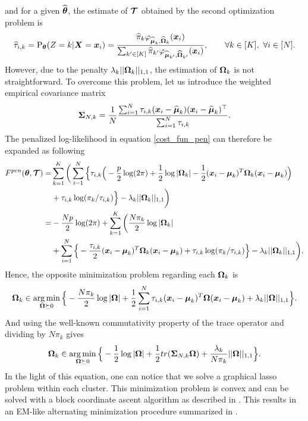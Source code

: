 and for a given $\widehat{{\boldsymbol\theta}}$, the estimate of $\boldsymbol{\mathcal T}$ obtained by the second optimization problem is
\begin{equation}
\label{em-sols-tau}
\widehat\tau_{i,k} = \text{P}_{{\boldsymbol\theta}}(Z=k|\boldsymbol X=\boldsymbol x_i)=\frac{\widehat\pi_k\varphi_{\widehat{\boldsymbol\mu}_k,\widehat{\boldsymbol\Omega}_k}(\boldsymbol x_i)}{\sum_{k'\in[K]}\widehat\pi_{k'}\varphi_{\widehat{\boldsymbol\mu}_{k'},\widehat{\boldsymbol\Omega}_{k'}}(\boldsymbol x_i)},\qquad\forall k\in[K],\ \forall i\in[N].
\end{equation}
However, due to the penalty $\lambda_k||\boldsymbol\Omega_k||_{1,1}$, the estimation of $\boldsymbol\Omega_k$ is not straightforward. To overcome this problem, let us introduce the weighted empirical covariance matrix
\begin{equation}
\boldsymbol\Sigma_{N,k} = \frac{1}{N}\frac{\sum_{i=1}^N\tau_{i,k}(\boldsymbol x_i-\widehat{\boldsymbol\mu}_k)(\boldsymbol x_i-\widehat{\boldsymbol\mu}_k)^\top}{\sum_{i=1}^N\tau_{i,k}}.
\end{equation}
The penalized log-likelihood in equation \eqref{cost_fun_pen} can therefore be expanded as following
\begin{align*}
\label{cost_fun_pen_2}
F^{pen}({\boldsymbol\theta},\boldsymbol{\mathcal T})  =& \sum_{k=1}^K \bigg( \sum_{i=1}^{N}\Big\{ \tau_{i,k} \Big(
-\frac{p}{2}\log(2\pi)+\frac{1}{2}\log|\boldsymbol\Omega_k|
-\frac{1}{2}(\boldsymbol x_i-\boldsymbol\mu_k)^T\boldsymbol\Omega_k(\boldsymbol x_i-\boldsymbol\mu_k) \Big)\\
&+\tau_{i,k} \log(\pi_k/\tau_{i,k})\Big\} -\lambda_k||\boldsymbol\Omega_k||_{1,1}\bigg)\\
=& -\frac{Np}{2}\log(2\pi)+\sum_{k=1}^K \bigg(\frac{N\pi_k}{2}\log|\boldsymbol\Omega_k|\\
&+\sum_{i=1}^{N}\Big\{ -\frac{\tau_{i,k}}{2}(\boldsymbol x_i-\boldsymbol\mu_k)^T\boldsymbol\Omega_k(\boldsymbol x_i-\boldsymbol\mu_k)+\tau_{i,k} \log(\pi_k/\tau_{i,k})\Big\} -\lambda_k||\boldsymbol\Omega_k||_{1,1}\bigg). 
\end{align*}
Hence, the opposite minimization problem regarding each $\boldsymbol\Omega_k$ is
\begin{equation}
\boldsymbol\Omega_k \in \operatorname*{arg\,min}_{ \boldsymbol\Omega\succeq 0}\Big\{-\frac{N\pi_k}{2}\log|\boldsymbol\Omega|+\frac{1}{2}\sum_{i=1}^{N}\tau_{i,k}(\boldsymbol x_i-\boldsymbol\mu_k)^T\boldsymbol\Omega(\boldsymbol x_i-\boldsymbol\mu_k)+\lambda_k||\boldsymbol\Omega||_{1,1}\Big\}.
\end{equation}
And using the well-known commutativity property of the trace operator and dividing by $N\pi_k$ gives
\begin{equation}
\boldsymbol\Omega_k \in \operatorname*{arg\,min}_{ \boldsymbol\Omega\succeq 0} \Big\{ -\frac{1}{2}\log|\boldsymbol\Omega| +\frac{1}{2} tr(\boldsymbol\Sigma_{N,k}\boldsymbol\Omega)+\frac{\lambda_k}{N\pi_k}||\boldsymbol\Omega||_{1,1}\Big\}.
\end{equation}
In the light of this equation, one can notice that we solve a graphical lasso problem within each cluster. This minimization problem is convex and can be solved with a block coordinate ascent algorithm as described in \citep{mazum_lasso}. This results in an EM-like alternating minimization procedure summarized in .
